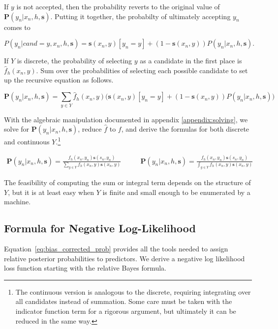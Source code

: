 \documentclass[twoside]{article}
\begin{document}
If \(y\) is not accepted, then the probability reverts to the original value of \(\mathbf{P}(y_n|x_n,h,\mathbf{s})\). Putting it together, the probabilty of ultimately accepting \(y_n\) comes to

\[P(y_n|cand=y,x_n,h,\mathbf{s})=\mathbf{s}(x_n,y)\left [y_n = y\right ] + (1-\mathbf{s}(x_n,y))P(y_n|x_n,h,\mathbf{s}).\]

If \(Y\) is discrete, the probability of selecting \(y\) as a candidate in the first place is \(\hat{f}_h(x_n, y)\). Sum over the probabilities of selecting each possible candidate to set up the recursive equation as follows.

\begin{equation}
\label{eq:bias_corrected_setup}
\mathbf{P}(y_n|x_n,h,\mathbf{s})=\sum_{y \in Y}\hat{f}_h(x_n,y)\big(\mathbf{s}(x_n,y)\left [y_n = y\right ] + (1-\mathbf{s}(x_n,y))P(y_n|x_n,h,\mathbf{s})\big)
\end{equation}

With the algebraic manipulation documented in appendix \ref{appendix:solving}, we solve for \(\mathbf{P}(y_n|x_n,h,\mathbf{s})\), reduce \(\hat{f}\) to \(f\), and derive the formulas for both discrete and continuous \(Y\).\footnote{The continuous version is analogous to the discrete, requiring integrating over all candidates instead of summation. Some care must be taken with the indicator function term for a rigorous argument, but ultimately it can be reduced in the same way.}

\begin{align}
\label{eq:bias_corrected_prob}
\mathbf{P}(y_n|x_n,h,\mathbf{s})=\frac{f_h(x_n,y_n)\mathbf{s}(s_n,y_n)}{\sum_{y \in Y}f_h(x_n,y)\mathbf{s}(x_n,y)} &
\qquad\mathbf{P}(y_n|x_n,h,\mathbf{s})=\frac{f_h(x_n,y_n)\mathbf{s}(s_n,y_n)}{\int_{y \in Y}f_h(x_n,y)\mathbf{s}(x_n,y)}
\end{align}

The feasibility of computing the sum or integral term depends on the structure of \(Y\), but it is at least easy when \(Y\) is finite and small enough to be enumerated by a machine.

\subsection{Formula for Negative Log-Likelihood}

Equation~\eqref{eq:bias_corrected_prob} provides all the tools needed to assign relative posterior probabilities to predictors. We derive a negative log likelihood loss function starting with the relative Bayes formula.
\end{document}
